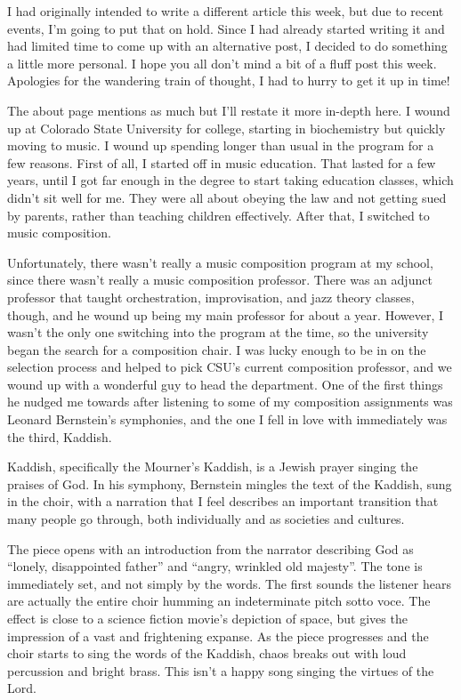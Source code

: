 
I had originally intended to write a different article this week, but due to recent events, I'm going to put that on hold. Since I had already started writing it and had limited time to come up with an alternative post, I decided to do something a little more personal. I hope you all don't mind a bit of a fluff post this week. Apologies for the wandering train of thought, I had to hurry to get it up in time!

The about page mentions as much but I'll restate it more in-depth here. I wound up at Colorado State University for college, starting in biochemistry but quickly moving to music. I wound up spending longer than usual in the program for a few reasons. First of all, I started off in music education. That lasted for a few years, until I got far enough in the degree to start taking education classes, which didn't sit well for me. They were all about obeying the law and not getting sued by parents, rather than teaching children effectively. After that, I switched to music composition.

Unfortunately, there wasn't really a music composition program at my school, since there wasn't really a music composition professor. There was an adjunct professor that taught orchestration, improvisation, and jazz theory classes, though, and he wound up being my main professor for about a year. However, I wasn't the only one switching into the program at the time, so the university began the search for a composition chair. I was lucky enough to be in on the selection process and helped to pick CSU's current composition professor, and we wound up with a wonderful guy to head the department. One of the first things he nudged me towards after listening to some of my composition assignments was Leonard Bernstein's symphonies, and the one I fell in love with immediately was the third, Kaddish.

Kaddish, specifically the Mourner's Kaddish, is a Jewish prayer singing the praises of God. In his symphony, Bernstein mingles the text of the Kaddish, sung in the choir, with a narration that I feel describes an important transition that many people go through, both individually and as societies and cultures.

The piece opens with an introduction from the narrator describing God as ``lonely, disappointed father'' and ``angry, wrinkled old majesty''. The tone is immediately set, and not simply by the words. The first sounds the listener hears are actually the entire choir humming an indeterminate pitch sotto voce. The effect is close to a science fiction movie's depiction of space, but gives the impression of a vast and frightening expanse. As the piece progresses and the choir starts to sing the words of the Kaddish, chaos breaks out with loud percussion and bright brass. This isn't a happy song singing the virtues of the Lord.

